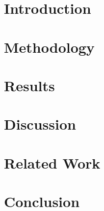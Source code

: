 \documentclass[smallextended]{svjour3}       %
\begin{document}
\section{Introduction}


\section{Methodology}


\section{Results}


\section{Discussion}


\section{Related Work}


\section{Conclusion}





%
%


\end{document}

